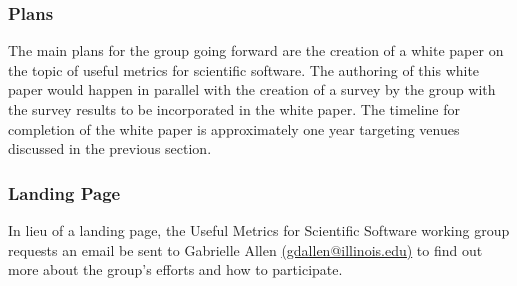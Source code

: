 \subsubsection{Plans}

The main plans for the group going forward are the creation of a white paper on the topic of useful metrics for scientific software.  The authoring of this white paper would happen in parallel with the creation of a survey by the group with the survey results to be incorporated in the white paper.  The timeline for completion of the white paper is approximately one year targeting venues discussed in the previous section.

\subsubsection{Landing Page}

In lieu of a landing page, the Useful Metrics for Scientific Software working group requests an email be sent to Gabrielle Allen \href{mailto:gdallen@illinois.edu}{(gdallen@illinois.edu)} to find out more about the group's efforts and how to participate.
